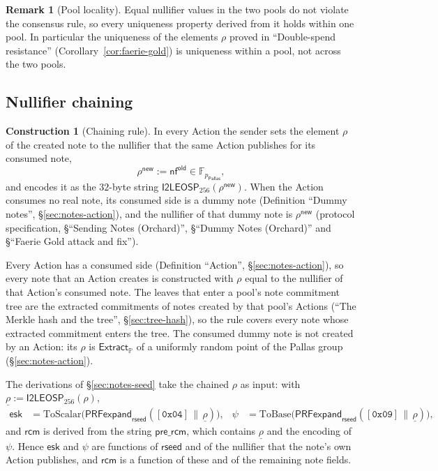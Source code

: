 \documentclass[11pt,a4paper]{article}
\theoremstyle{definition}
\newtheorem{construction}[theorem]{Construction}
\newtheorem{remark}[theorem]{Remark}
\newcommand{\F}{\mathbb{F}}
\newcommand{\PP}{\mathbb{P}}
\newcommand{\nfsym}{\mathsf{nf}}
\newcommand{\Pallas}{\ensuremath{\mathsf{Pallas}}}
\newcommand{\Extract}{\ensuremath{\mathsf{Extract}}}
\newcommand{\rcm}{\ensuremath{\mathsf{rcm}}}
\begin{document}
\begin{remark}[Pool locality]
Equal nullifier values in the two pools do not violate the consensus rule,
so every uniqueness property derived from it holds within one pool. In
particular the uniqueness of the elements $\rho$ proved in ``Double-spend
resistance'' (Corollary~\ref{cor:faerie-gold}) is uniqueness within a pool,
not across the two pools.
\end{remark}

\subsection{Nullifier chaining}\label{sec:nf-chaining}

\begin{construction}[Chaining rule]
In every Action the sender sets the element $\rho$ of the created note to the
nullifier that the same Action publishes for its consumed note,
\[
  \rho^{\mathsf{new}} := \nfsym^{\mathsf{old}} \in \F_{p_{\Pallas}},
\]
and encodes it as the $32$-byte string
$\mathsf{I2LEOSP}_{256}(\rho^{\mathsf{new}})$. When the Action consumes no
real note, its consumed side is a dummy note (Definition ``Dummy notes'',
\S\ref{sec:notes-action}), and the nullifier of that dummy note is
$\rho^{\mathsf{new}}$ (protocol specification, \S``Sending Notes
(Orchard)'', \S``Dummy Notes (Orchard)'' and \S``Faerie Gold attack and
fix'').
\end{construction}

Every Action has a consumed side (Definition ``Action'',
\S\ref{sec:notes-action}), so every note that an Action creates is
constructed with $\rho$ equal to the nullifier of that Action's consumed
note. The leaves that enter a pool's note commitment tree are the extracted
commitments of notes created by that pool's Actions (``The Merkle hash and
the tree'', \S\ref{sec:tree-hash}), so the rule covers every note whose
extracted commitment enters the tree. The consumed dummy note is not
created by an Action: its $\rho$ is $\Extract_{\PP}$ of a uniformly random
point of the Pallas group (\S\ref{sec:notes-action}).

The derivations of \S\ref{sec:notes-seed} take the chained $\rho$ as input:
with $\underline{\rho} := \mathsf{I2LEOSP}_{256}(\rho)$,
\begin{align*}
  \mathsf{esk} &= \mathrm{ToScalar}\bigl(\mathsf{PRFexpand}_{\mathsf{rseed}}
    ([\mathtt{0x04}] \,\|\, \underline{\rho})\bigr), &
  \psi &= \mathrm{ToBase}\bigl(\mathsf{PRFexpand}_{\mathsf{rseed}}
    ([\mathtt{0x09}] \,\|\, \underline{\rho})\bigr),
\end{align*}
and $\rcm$ is derived from the string $\mathsf{pre\_rcm}$, which contains
$\underline{\rho}$ and the encoding of $\psi$. Hence $\mathsf{esk}$ and $\psi$
are functions of $\mathsf{rseed}$ and of the nullifier that the note's own
Action publishes, and $\rcm$ is a function of these and of the remaining
note fields.
\end{document}
